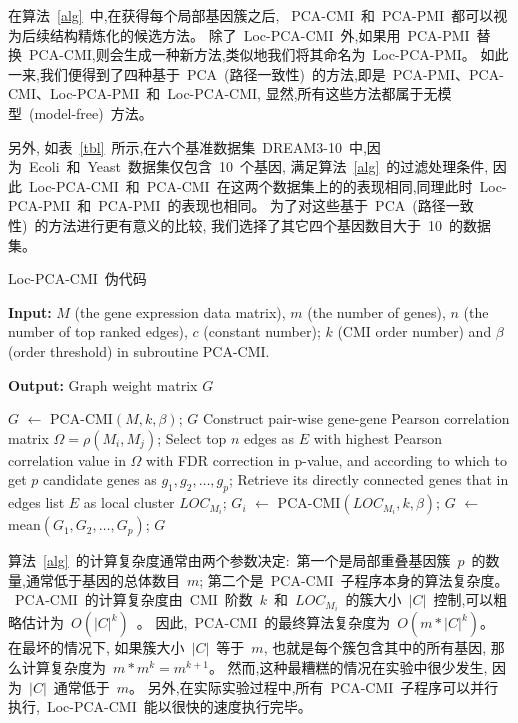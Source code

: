 在算法~\ref{alg}~中,在获得每个局部基因簇之后,
~PCA-CMI~和~PCA-PMI~都可以视为后续结构精炼化的候选方法。
除了~Loc-PCA-CMI~外,如果用~PCA-PMI~替换~PCA-CMI,则会生成一种新方法,类似地我们将其命名为~Loc-PCA-PMI。
如此一来,我们便得到了四种基于~PCA~(路径一致性)~的方法,即是~PCA-PMI、PCA-CMI、Loc-PCA-PMI~和~Loc-PCA-CMI,
显然,所有这些方法都属于无模型~(model-free)~方法。

另外, 如表~\ref{tbl}~所示,在六个基准数据集~DREAM3-10~中,因为~Ecoli~和~Yeast~数据集仅包含~10~个基因,
满足算法~\ref{alg}~的过滤处理条件,
因此~Loc-PCA-CMI~和~PCA-CMI~在这两个数据集上的的表现相同,同理此时~Loc-PCA-PMI~和~PCA-PMI~的表现也相同。
为了对这些基于~PCA~(路径一致性)~的方法进行更有意义的比较,
我们选择了其它四个基因数目大于~10~的数据集。

\begin{algorithm}[!htbp]
    \caption{Loc-PCA-CMI~伪代码} %
    \label{alg}
    {\bf Input:} %
    $M$ (the gene expression data matrix), $m$ (the number of genes), $n$ (the number of top ranked edges), $c$ (constant number); $k$ (CMI order number) and $\beta$ (order threshold) in subroutine PCA-CMI.
    
    {\bf Output:} %
    Graph weight matrix $G$ 
    \begin{algorithmic}[1]
    \State $G$ $\leftarrow$ PCA-CMI$(M, k, \beta)$;
    \State \Return $G$
    \Else
    \State Construct pair-wise gene-gene Pearson correlation matrix $\Omega = \rho(M_i, M_j)$;
    \State Select top $n$ edges as $E$ with highest Pearson correlation value in $\Omega$ with FDR correction in p-value, and according to which to get 
    $p$ candidate genes as $g_1,g_2,\ldots,g_{p}$;
      \State Retrieve its directly connected genes that in edges list $E$ as local cluster $LOC_{M_i}$;
    \EndFor
      \State $G_{i}$ $\leftarrow$ PCA-CMI$(LOC_{M_i}, k, \beta)$;
    \EndFor
    \State $G$ $\leftarrow$ mean$(G_{1},G_{2},\ldots,G_{p})$;
    \State \Return $G$ 
    \EndIf
    \end{algorithmic}
\end{algorithm}

算法~\ref{alg}~的计算复杂度通常由两个参数决定:~第一个是局部重叠基因簇~$p$~的数量,通常低于基因的总体数目~$m$; 第二个是~PCA-CMI~子程序本身的算法复杂度。
~PCA-CMI~的计算复杂度由~CMI~阶数~$k$~和~$LOC_{M_i}$~的簇大小~$|C|$~控制,可以粗略估计为~$O(|C|^k)$~。
因此,~PCA-CMI~的最终算法复杂度为~$O(m *|C|^k)$。
在最坏的情况下, 如果簇大小~$|C|$~等于~$m$, 也就是每个簇包含其中的所有基因, 那么计算复杂度为~$m*m^k = m^{k+1}$。 
然而,这种最糟糕的情况在实验中很少发生, 因为~$|C|$~通常低于~$m$。
另外,在实际实验过程中,所有~PCA-CMI~子程序可以并行执行,~Loc-PCA-CMI~能以很快的速度执行完毕。

